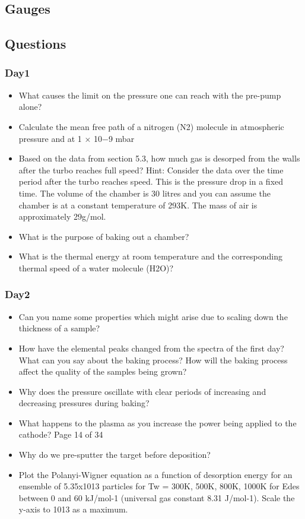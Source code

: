 \documentclass[]{article}
\begin{document}
\subsection{Gauges}
\subsection{Questions}
\subsubsection{Day1}
\begin{itemize}  
	\item What causes the limit on the pressure one can reach with the pre-pump alone? 
	\item  Calculate the mean free path of a nitrogen (N2) molecule in atmospheric pressure and at 1 × 10−9 mbar 
	\item Based on the data from section 5.3, how much gas is desorped from the walls after the turbo reaches full speed? Hint: Consider the data over the time period after the turbo reaches speed. This is the pressure drop in a ﬁxed time. The volume of the chamber is 30 litres and you can assume the chamber is at a constant temperature of 293K. The mass of air is approximately 29g/mol.
	 

	\item What is the purpose of baking out a chamber? 
	\item What is the thermal energy at room temperature and the corresponding thermal speed of a water molecule (H2O)?
\end{itemize}
\subsubsection{Day2}
\begin{itemize}
	 \item Can you name some properties which might arise due to scaling down the thickness of a sample? \item How have the elemental peaks changed from the spectra of the ﬁrst day? What can you say about the baking process? How will the baking process aﬀect the quality of the samples being grown? \item Why does the pressure oscillate with clear periods of increasing and decreasing pressures during baking? \item What happens to the plasma as you increase the power being applied to the cathode?
	Page 14 of 34
	\item Why do we pre-sputter the target before deposition? \item  Plot the Polanyi-Wigner equation as a function of desorption energy for an ensemble of 5.35x1013 particles for Tw = 300K, 500K, 800K, 1000K for Edes between 0 and 60 kJ/mol-1 (universal gas constant 8.31 J/mol-1). Scale the y-axis to 1013 as a maximum.
	
\end{itemize}
\end{document}
